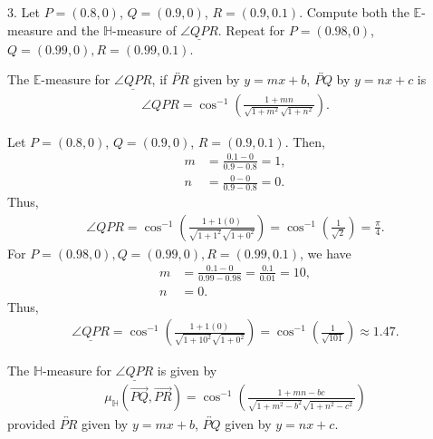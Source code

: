\documentclass{report}
\begin{document}
    \bigbreak \noindent 
    \begin{mdframed}
        3. Let $P = (0.8,0)$, $Q = (0.9, 0)$, $R = (0.9,0.1)$. Compute both the $\mathbb{E}$-measure and the $\mathbb{H}$-measure of $\underline{\angle QPR}$. Repeat for $P=(0.98,0)$, $Q = (0.99,0), R=(0.99,0.1)$.
    \end{mdframed}
    \bigbreak \noindent 
    \begin{remark}
        The $\mathbb{E}$-measure for $\underline{\angle QPR}$, if $\overleftrightarrow{PR}$ given by $y=mx+b$, $\overleftrightarrow{PQ}$ by $y=nx+c$ is
        \begin{align*}
            \angle QPR = \cos^{-1}{\left(\frac{1+mn}{\sqrt{1+m^{2}}\sqrt{1+n^{2}}}\right)}
        .\end{align*}
    \end{remark}
    \bigbreak \noindent 
    Let $P = (0.8,0)$, $Q = (0.9, 0)$, $R = (0.9,0.1)$. Then,
    \begin{align*}
        m &= \frac{0.1 - 0}{0.9-0.8} = 1, \\
        n &= \frac{0 - 0}{0.9 -0.8} = 0
    .\end{align*}
    Thus,
    \begin{align*}
        \angle QPR = \cos^{-1}{\left(\frac{1+1(0)}{\sqrt{1+1^{2}}\sqrt{1+0^{2}}}\right)} = \cos^{-1}{\left(\frac{1}{\sqrt{2}}\right)} = \frac{\pi}{4}
    .\end{align*}
    For $P=(0.98,0), Q=(0.99,0), R=(0.99,0.1)$, we have
    \begin{align*}
        m &= \frac{0.1 - 0}{0.99-0.98} = \frac{0.1}{0.01} = 10,\\
        n&= 0
    .\end{align*}
    Thus,
    \begin{align*}
        \underline{\angle QPR} = \cos^{-1}{\left(\frac{1+1(0)}{\sqrt{1+10^{2}}\sqrt{1+0^{2}}}\right)} = \cos^{-1}{\left(\frac{1}{\sqrt{101}}\right)} \approx  1.47
    .\end{align*}
    \bigbreak \noindent 
    \begin{remark}
        The $\mathbb{H}$-measure for $\underline{\angle QPR}$ is given by 
        \begin{align*}
            \mu_{\mathbb{H}}(\overrightarrow{PQ}, \overrightarrow{PR}) = \cos^{-1}{\left(\frac{1+mn-bc}{\sqrt{1+m^{2}-b^{2}}\sqrt{1+n^{2}-c^{2}}}\right)} 
        \end{align*}
        provided $\overleftrightarrow{PR}$ given by $y=mx+b$, $\overleftrightarrow{PQ}$ given by $y = nx+c$.
    \end{remark}
\end{document}

